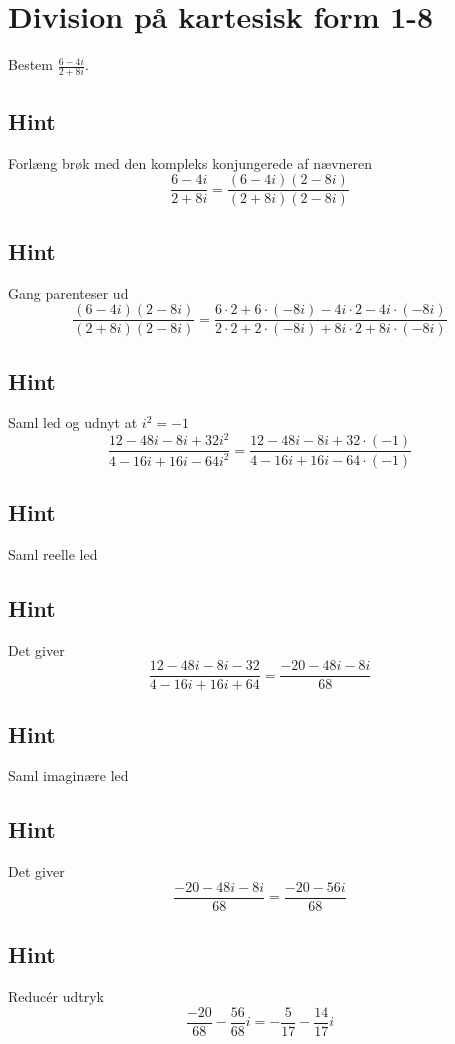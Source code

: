 \documentclass{article}
\newenvironment{exercise}[1]{\newpage\section{#1}}{}
\newcommand{\answerbox}[1]{\fbox{$#1$}}
\newcommand{\hint}{\subsection*{Hint}}
\begin{document}
\begin{exercise}{Division på kartesisk form 1-8}
	
	Bestem $\frac{6-4i}{2+8i}$.
	
	\answerbox{-\frac{5}{17} - \frac{14}{17}i}
	
	
	\hint 
	
	Forlæng brøk med den kompleks konjungerede af nævneren
	\[
	\frac{6-4i}{2+8i} = \frac{(6-4i)(2-8i)}{(2+8i)(2-8i)}
	\]
	
	\hint
	
	Gang parenteser ud
	\[
	\frac{(6-4i)(2-8i)}{(2+8i)(2-8i)} = \frac{6 \cdot 2 + 6 \cdot (-8i) -4i \cdot 2 -4i \cdot (-8i)}{2 \cdot 2 + 2 \cdot (-8i) + 8i \cdot 2 + 8i \cdot (-8i)}
	\]
	
	\hint 
	
	Saml led og udnyt at $i^2 = -1$
	\[
	\frac{12 -48i -8i+32i^2}{4 -16i +16i -64i^2} = \frac{12 -48i -8i+32 \cdot (-1)}{4 -16i +16i -64 \cdot (-1)} 
	\]
	
	\hint
	
	Saml reelle led
	
	\hint
	
	Det giver
	\[
	\frac{12 -48i -8i-32}{4 -16i +16i +64}  = \frac{-20 -48i-8i}{68}	
	\]
	
	\hint
	
	Saml imaginære led
	
	
	\hint
	
	Det giver 
	\[
	\frac{-20 -48i-8i}{68} = \frac{-20 -56i}{68}
	\]
	
	\hint
	
	Reducér udtryk
	\[
	\frac{-20}{68} - \frac{56}{68}i = -\frac{5}{17} - \frac{14}{17}i
	\]
	
\end{exercise}
\end{document}
